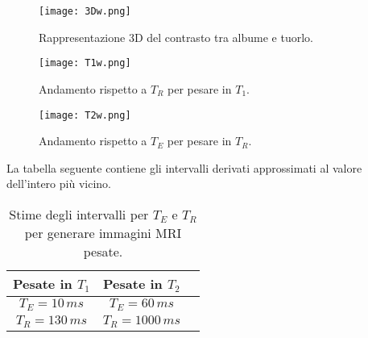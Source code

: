 \begin{figure}[h!]
\centering
\texttt{[image: 3Dw.png]}
\caption{Rappresentazione 3D del contrasto tra albume e tuorlo.}
\label{fig:3D}
\end{figure}

\begin{figure}[h!]
\centering
\texttt{[image: T1w.png]}
\caption{Andamento rispetto a $T_R$ per pesare in $T_1$.}
\label{subfig:T1}
\end{figure}
\clearpage
\begin{figure}[h!]
\centering
\texttt{[image: T2w.png]}
\caption{Andamento rispetto a $T_E$ per pesare in $T_R$.}
\label{subfig:T2}
\end{figure}

La tabella seguente contiene gli intervalli derivati approssimati al valore dell'intero più vicino.
\begin{table}[h!]
	\centering
	\begin{tabular}{ccc}
	\toprule
		\textbf{Pesate in $T_1$} &	\textbf{Pesate in $T_2$}	\\
	\midrule
		$T_E = 10\,ms$			&		$T_E = 60\,ms$	 \\	
		$T_R = 130\,ms$			&		$T_R = 1000\,ms$ \\
	\bottomrule
	\end{tabular}
	\caption{Stime degli intervalli per $T_E$ e $T_R$ per generare immagini MRI pesate.}	
	\label{tab:Pesate}
\end{table}
